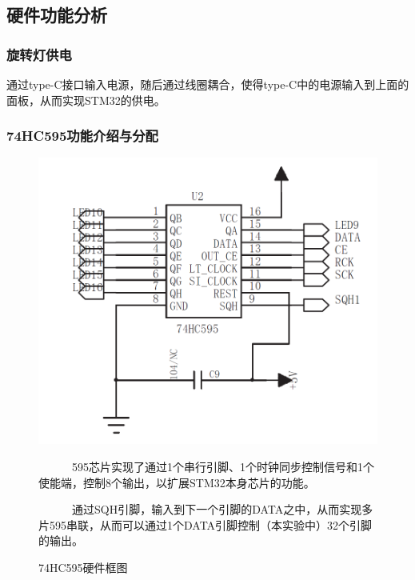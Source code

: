 \documentclass{article}
\begin{document}
\subsection{硬件功能分析}
\subsubsection{旋转灯供电}
通过type-C接口输入电源，随后通过线圈耦合，使得type-C中的电源输入到上面的面板，从而实现STM32的供电。
\subsubsection{74HC595功能介绍与分配}
\begin{figure}[H]
\begin{minipage}{0.5\textwidth}
    \centering
    \includegraphics[width=0.8\linewidth]{assets/1.png}
    \caption{74HC595硬件框图}
    \label{fig:hard}
\end{minipage}
\begin{minipage}{0.5\textwidth}
\ \ \ \ \ \ 595芯片实现了通过1个串行引脚、1个时钟同步控制信号和1个使能端，控制8个输出，以扩展STM32本身芯片的功能。\par
\ \ \ \ \ \ 通过SQH引脚，输入到下一个引脚的DATA之中，从而实现多片595串联，从而可以通过1个DATA引脚控制（本实验中）32个引脚的输出。\par
\end{minipage}
\end{figure}
\end{document}

